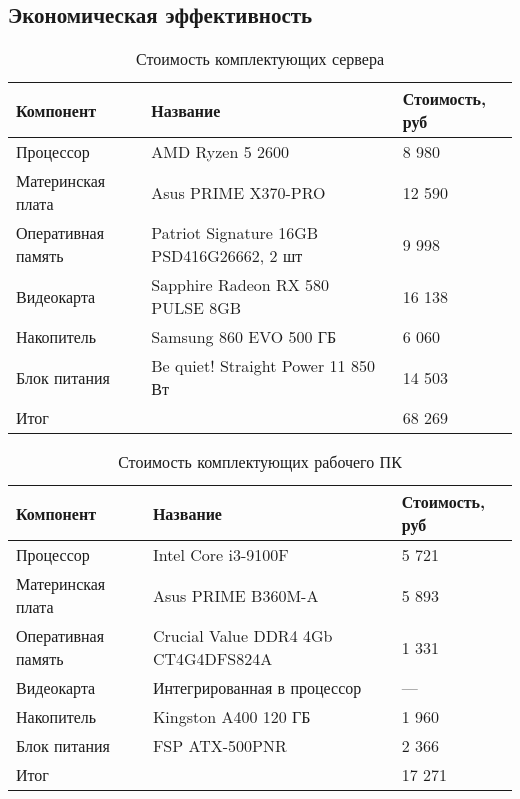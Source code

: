 \subsection{Экономическая эффективность}

\begin{table}[b]
    \centering
    \caption{Стоимость комплектующих сервера}
    \label{tab:server_price}
    \begin{tabu}to \linewidth{XX[1,c,m]X[1,r,m]}
        \toprule
        Компонент & Название & Стоимость, руб \\
        \midrule
        Процессор          & AMD Ryzen 5 2600                          & 8 980  \\
        Материнская плата  & Asus PRIME X370-PRO                       & 12 590 \\
        Оперативная память & Patriot Signature 16GB PSD416G26662, 2 шт & 9 998   \\
        Видеокарта         & Sapphire Radeon RX 580 PULSE 8GB          & 16 138  \\
        Накопитель         & Samsung 860 EVO 500 ГБ                    & 6 060  \\
        Блок питания       & Be quiet! Straight Power 11 850 Вт        & 14 503 \\
        \midrule
        Итог & & 68 269 \\
        \bottomrule
    \end{tabu}
\end{table}

\begin{table}[t]
    \centering
    \caption{Стоимость комплектующих рабочего ПК}
    \label{tab:pc_price}
    \begin{tabu}to \linewidth{XX[1,c,m]X[1,r,m]}
        \toprule
        Компонент & Название & Стоимость, руб \\
        \midrule
        Процессор          & Intel Core i3-9100F                 & 5 721 \\
        Материнская плата  & Asus PRIME B360M-A                  & 5 893 \\
        Оперативная память & Crucial Value DDR4 4Gb CT4G4DFS824A & 1 331 \\
        Видеокарта         & Интегрированная в процессор         & —     \\
        Накопитель         & Kingston A400 120 ГБ                & 1 960  \\
        Блок питания       & FSP ATX-500PNR                      & 2 366  \\
        \midrule
        Итог & & 17 271 \\
        \bottomrule
    \end{tabu}
\end{table}

